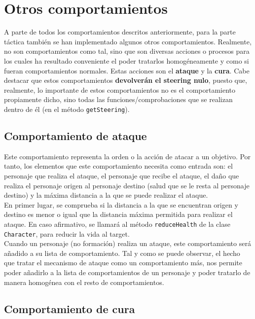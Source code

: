 \medskip
\section{Otros comportamientos}

A parte de todos los comportamientos descritos anteriormente, para la parte táctica también se han implementado algunos otros comportamientos. Realmente, no son comportamientos como tal, sino que son diversas acciones o procesos para los cuales ha resultado conveniente el poder tratarlos homogéneamente y como si fueran comportamientos normales. Estas acciones son el \textbf{ataque} y la \textbf{cura}. Cabe destacar que estos comportamientos \textbf{devolverán el steering nulo}, puesto que, realmente, lo importante de estos comportamientos no es el comportamiento propiamente dicho, sino todas las funciones/comprobaciones que se realizan dentro de él (en el método \texttt{getSteering}).

\subsection{Comportamiento de ataque}

Este comportamiento representa la orden o la acción de atacar a un objetivo. Por tanto, los elementos que este comportamiento necesita como entrada son: el personaje que realiza el ataque, el personaje que recibe el ataque, el daño que realiza el personaje origen al personaje destino (salud que se le resta al personaje destino) y la máxima distancia a la que se puede realizar el ataque. \\

En primer lugar, se comprueba si la distancia a la que se encuentran origen y destino es menor o igual que la distancia máxima permitida para realizar el ataque. En caso afirmativo, se llamará al método \texttt{reduceHealth} de la clase \texttt{Character}, para reducir la vida al target. \\

Cuando un personaje (no formación) realiza un ataque, este comportamiento será añadido a su lista de comportamiento. Tal y como se puede observar, el hecho que tratar el mecanismo de ataque como un comportamiento más, nos permite poder añadirlo a la lista de comportamientos de un personaje y poder tratarlo de manera homogénea con el resto de comportamientos.

\subsection{Comportamiento de cura}

